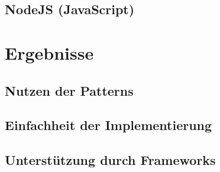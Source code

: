 \subsection{NodeJS (JavaScript)}

\section{Ergebnisse}
\subsection{Nutzen der Patterns}
\subsection{Einfachheit der Implementierung}
\subsection{Unterstützung durch Frameworks}
